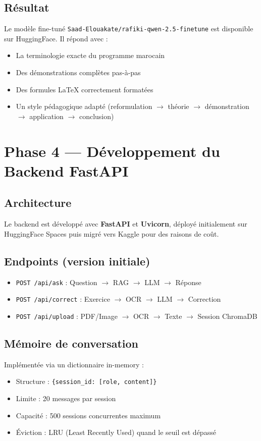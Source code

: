 \documentclass[12pt,a4paper]{report}
\begin{document}
\subsection{Résultat}
Le modèle fine-tuné \texttt{Saad-Elouakate/rafiki-qwen-2.5-finetune} est disponible sur HuggingFace. Il répond avec :
\begin{itemize}
    \item La terminologie exacte du programme marocain
    \item Des démonstrations complètes pas-à-pas
    \item Des formules LaTeX correctement formatées
    \item Un style pédagogique adapté (reformulation $\rightarrow$ théorie $\rightarrow$ démonstration $\rightarrow$ application $\rightarrow$ conclusion)
\end{itemize}

\section{Phase 4 — Développement du Backend FastAPI}

\subsection{Architecture}
Le backend est développé avec \textbf{FastAPI} et \textbf{Uvicorn}, déployé initialement sur HuggingFace Spaces puis migré vers Kaggle pour des raisons de coût.

\subsection{Endpoints (version initiale)}
\begin{itemize}
    \item \texttt{POST /api/ask} : Question $\rightarrow$ RAG $\rightarrow$ LLM $\rightarrow$ Réponse
    \item \texttt{POST /api/correct} : Exercice $\rightarrow$ OCR $\rightarrow$ LLM $\rightarrow$ Correction
    \item \texttt{POST /api/upload} : PDF/Image $\rightarrow$ OCR $\rightarrow$ Texte $\rightarrow$ Session ChromaDB
\end{itemize}

\subsection{Mémoire de conversation}
Implémentée via un dictionnaire in-memory :
\begin{itemize}
    \item Structure : \texttt{\{session\_id: [{role, content}]\}}
    \item Limite : 20 messages par session
    \item Capacité : 500 sessions concurrentes maximum
    \item Éviction : LRU (Least Recently Used) quand le seuil est dépassé
\end{itemize}
\end{document}
